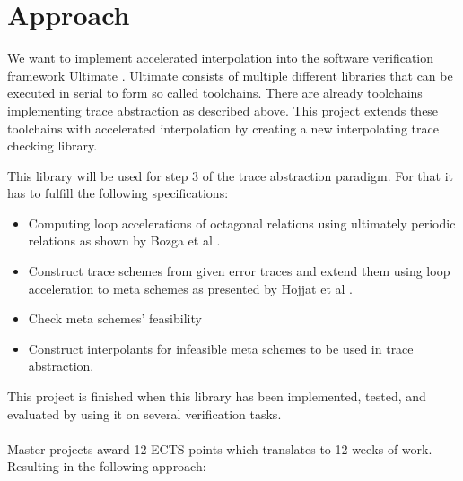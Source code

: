 \documentclass{article}
\begin{document}
\section{Approach}
We want to implement accelerated interpolation into the software verification framework Ultimate \cite{Zitat02}. Ultimate consists of multiple different libraries that can be executed in serial to form so called toolchains. There are already toolchains implementing trace abstraction as described above. This project extends these toolchains with accelerated interpolation by creating a new interpolating trace checking library. \par 
This library will be used for step 3 of the trace abstraction paradigm. For that it has to fulfill the following specifications: 
\begin{itemize}
	\item Computing loop accelerations of octagonal relations using ultimately periodic relations as shown by Bozga et al \cite{10.1007/978-3-642-14295-6_23}. 
	\item Construct trace schemes from given error traces and extend them using loop acceleration to meta schemes as presented by Hojjat et al \cite{10.1007/978-3-642-33386-6_16}.
	\item Check meta schemes' feasibility
	\item Construct interpolants for infeasible meta schemes to be used in trace abstraction.
\end{itemize}
This project is finished when this library has been implemented, tested, and evaluated by using it on several verification tasks. \\ \\
Master projects award 12 ECTS points which translates to 12 weeks of work. Resulting in the following approach:
\end{document}
